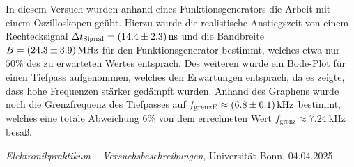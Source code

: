 \documentclass{article}
\begin{document}
        
        In diesem Versuch wurden anhand eines Funktionsgenerators die Arbeit mit einem Oszilloskopen geübt. 
        Hierzu wurde die realistische Anstiegszeit von einem Rechtecksignal 
        $\Delta t_\text{Signal} = \SI{14.4 \pm 2.3}{\nano\second}$
         und die Bandbreite $B = \SI{24.3 \pm 3.9}{\mega\hertz}$ für den Funktionsgenerator bestimmt, welches etwa nur $50\%$ des zu erwarteten Wertes entsprach.
         Des weiteren wurde ein Bode-Plot für einen Tiefpass aufgenommen, welches den Erwartungen entsprach, da es 
         zeigte, dass hohe Frequenzen stärker gedämpft wurden. Anhand des Graphens wurde noch die Grenzfrequenz des 
         Tiefpasses auf $f_{\text{grenzE}} \approx \SI{6.8 \pm 0.1}{\kilo\hertz}$ bestimmt, welches eine totale Abweichung
           $6 \% $ von dem errechneten Wert $ f_{\text{grenz}}
         \approx \SI{7.24}{\kilo\hertz}$ besaß.


        \begin{thebibliography}{9}

        \textit{Elektronikpraktikum -- Versuchsbeschreibungen}, Universität Bonn, 04.04.2025


\end{thebibliography}
\end{document}

